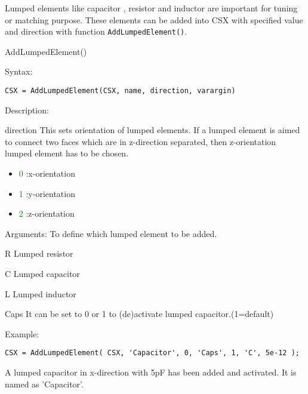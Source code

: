 Lumped elements like capacitor , resistor and inductor are important for tuning or matching purpose. These elements can be added into CSX with specified value and direction with function \texttt{AddLumpedElement()}. 

\begin{FontNameFunct}{AddLumpedElement()}
\end{FontNameFunct}


\begin{FontDescr}{Syntax:}
  \begin{lstlisting}
CSX = AddLumpedElement(CSX, name, direction, varargin)
  \end{lstlisting}
 \end{FontDescr} 
 
\begin{FontDescr}{Description:}
\begin{FontPara}{direction}
This sets orientation of lumped elements. If a lumped element is aimed to connect two faces which are in z-direction separated, then z-orientation lumped element has to be chosen. 
 \begin{itemize}
 \item \textcolor{green}{0} :x-orientation 
 \item \textcolor{green}{1} :y-orientation
 \item \textcolor{green}{2} :z-orientation
 \end{itemize}
 \end{FontPara}
\end{FontDescr}

  
\begin{FontDescr}{Arguments:} 
 To define which lumped element to be added. 
 
 \begin{FontPara}{R}
 Lumped resistor
 \end{FontPara}
 \begin{FontPara}{C}
 Lumped capacitor
 \end{FontPara}
 \begin{FontPara}{L}
 Lumped inductor
 \end{FontPara}
 \begin{FontPara}{Caps}
It can be set to 0 or 1 to (de)activate lumped capacitor.(1=default) 
 \end{FontPara}               
 
\end{FontDescr}
 
 
\begin{FontDescr}{Example:}

\begin{lstlisting} 
CSX = AddLumpedElement( CSX, 'Capacitor', 0, 'Caps', 1, 'C', 5e-12 );
\end{lstlisting}
 A lumped capacitor in x-direction with 5pF has been added and activated. It is named as 'Capacitor'. 
\end{FontDescr}